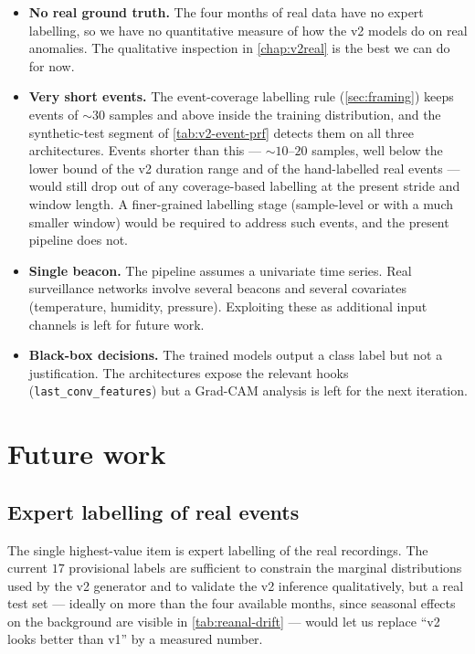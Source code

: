 \begin{itemize}[leftmargin=*, itemsep=0.25em]
    \item \textbf{No real ground truth.} The four months of real data
    have no expert labelling, so we have no quantitative measure of
    how the v2 models do on real anomalies. The qualitative inspection
    in \cref{chap:v2real} is the best we can do for now.
    \item \textbf{Very short events.} The event-coverage labelling
    rule (\cref{sec:framing}) keeps events of $\sim 30$ samples and
    above inside the training distribution, and the synthetic-test
    segment of \cref{tab:v2-event-prf} detects them on all three
    architectures. Events shorter than this --- $\sim 10$--$20$
    samples, well below the lower bound of the v2 duration range and
    of the hand-labelled real events --- would still drop out of any
    coverage-based labelling at the present stride and window length.
    A finer-grained labelling stage (sample-level or with a much
    smaller window) would be required to address such events, and
    the present pipeline does not.
    \item \textbf{Single beacon.} The pipeline assumes a univariate
    time series. Real surveillance networks involve several beacons
    and several covariates (temperature, humidity, pressure).
    Exploiting these as additional input channels is left for future
    work.
    \item \textbf{Black-box decisions.} The trained models output a
    class label but not a justification. The architectures expose the
    relevant hooks (\texttt{last\_conv\_features}) but a Grad-CAM
    analysis is left for the next iteration.
\end{itemize}

\section{Future work}
\label{sec:conc-future}

\subsection{Expert labelling of real events}

The single highest-value item is expert labelling of the real
recordings. The current $17$ provisional labels are sufficient to
constrain the marginal distributions used by the v2 generator and to
validate the v2 inference qualitatively, but a real test set
--- ideally on more than the four available months, since seasonal
effects on the background are visible in \cref{tab:reanal-drift} ---
would let us replace ``v2 looks better than v1'' by a measured number.

